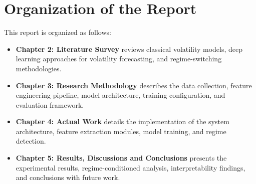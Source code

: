 \section{Organization of the Report}

This report is organized as follows:

\begin{itemize}
    \item \textbf{Chapter 2: Literature Survey} reviews classical volatility models, deep learning approaches for volatility forecasting, and regime-switching methodologies.
    \item \textbf{Chapter 3: Research Methodology} describes the data collection, feature engineering pipeline, model architecture, training configuration, and evaluation framework.
    \item \textbf{Chapter 4: Actual Work} details the implementation of the system architecture, feature extraction modules, model training, and regime detection.
    \item \textbf{Chapter 5: Results, Discussions and Conclusions} presents the experimental results, regime-conditioned analysis, interpretability findings, and conclusions with future work.
\end{itemize}
